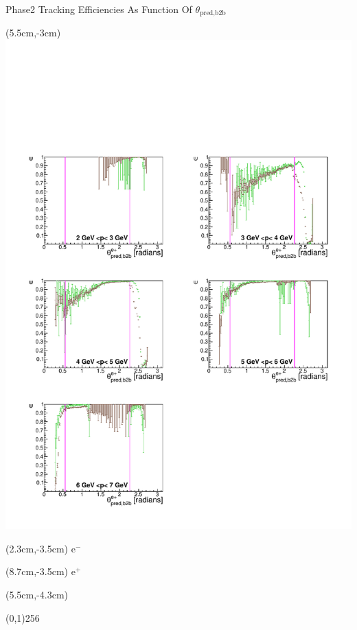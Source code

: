 \documentclass[8pt]{beamer}
\begin{document}
\begin{frame}{Phase2 Tracking Efficiencies As Function Of $\theta_{\textrm{pred,b2b}}$}
	\begin{textblock*}{6.5cm}(5.5cm,-3cm)
		\includegraphics[width=\textwidth]{VPlots/P2/xPMThetaep}
	\end{textblock*}
	
	
	\begin{textblock*}{2cm}(2.3cm,-3.5cm)
		$\textrm{e}^-$
	\end{textblock*}
	
	\begin{textblock*}{2cm}(8.7cm,-3.5cm)
		$\textrm{e}^+$
	\end{textblock*}
	
	
	
	\begin{textblock*}{11cm}(5.5cm,-4.3cm)
		
		\begin{center}
			\line(0,1){256}
		\end{center}
		

\end{textblock*}
\end{frame}
\end{document}
